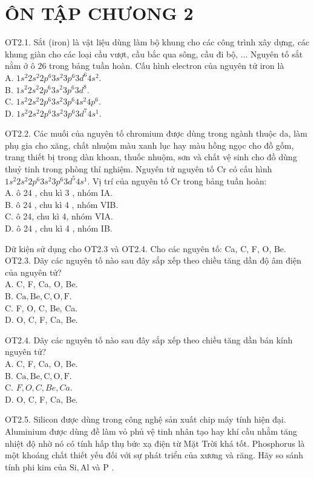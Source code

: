 \documentclass[10pt]{article}
\begin{document}
\section*{ÔN TẬP CHƯONG 2}
OT2.1. Sắt (iron) là vật liệu dùng làm bộ khung cho các công trình xây dựng, các khung giàn cho các loại cầu vượt, cầu bắc qua sông, cầu đi bộ, ... Nguyên tố sắt nằm ở ô 26 trong bảng tuần hoàn. Cấu hình electron của nguyên tử iron là\\
A. $1 s^{2} 2 s^{2} 2 p^{6} 3 s^{2} 3 p^{6} 3 d^{6} 4 s^{2}$.\\
B. $1 s^{2} 2 s^{2} 2 p^{6} 3 s^{2} 3 p^{6} 3 d^{8}$.\\
C. $1 s^{2} 2 s^{2} 2 p^{6} 3 s^{2} 3 p^{6} 4 s^{2} 4 p^{6}$.\\
D. $1 s^{2} 2 s^{2} 2 p^{6} 3 s^{2} 3 p^{6} 3 d^{7} 4 s^{1}$.

OT2.2. Các muối của nguyên tố chromium được dùng trong ngành thuộc da, làm phụ gia cho xăng, chất nhuộm màu xanh lục hay màu hồng ngọc cho đồ gốm, trang thiết bị trong dàn khoan, thuốc nhuộm, sơn và chất vệ sinh cho đồ dùng thuỷ tinh trong phòng thí nghiệm. Nguyên tử nguyên tố Cr có cấu hình $1 s^{2} 2 s^{2} 2 p^{6} 3 s^{2} 3 p^{6} 3 d^{5} 4 s^{1}$. Vị trí của nguyên tố Cr trong bảng tuần hoàn:\\
A. ô 24 , chu kì 3 , nhóm IA.\\
B. ô 24 , chu kì 4 , nhóm VIB.\\
C. ô 24, chu kì 4, nhóm VIA.\\
D. ô 24 , chu kì 4 , nhóm IB.

Dữ kiện sử dụng cho OT2.3 và OT2.4. Cho các nguyên tố: Ca, C, F, O, Be.\\
OT2.3. Dãy các nguyên tố nào sau đây sắp xếp theo chiều tăng dần độ âm điện của nguyên tử?\\
A. C, F, Ca, O, Be.\\
B. $\mathrm{Ca}, \mathrm{Be}, \mathrm{C}, \mathrm{O}, \mathrm{F}$.\\
C. F, O, C, Be, Ca.\\
D. O, C, F, Ca, Be.

OT2.4. Dãy các nguyên tố nào sau đây sắp xếp theo chiều tăng dần bán kính nguyên tử?\\
A. C, F, Ca, O, Be.\\
B. $\mathrm{Ca}, \mathrm{Be}, \mathrm{C}, \mathrm{O}, \mathrm{F}$.\\
C. $F, O, C, B e, C a$.\\
D. O, C, F, Ca, Be.

OT2.5. Silicon được dùng trong công nghệ sản xuất chip máy tính hiện đại. Aluminium được dùng đề làm vỏ phủ vệ tinh nhân tạo hay khí cầu nhằm tăng nhiệt độ nhờ nó có tính hấp thụ bức xạ điện từ Mặt Trời khá tốt. Phosphorus là một khoáng chất thiết yếu đối với sự phát triển của xương và răng. Hãy so sánh tính phi kim của $\mathrm{Si}, \mathrm{Al}$ và P .
\end{document}
